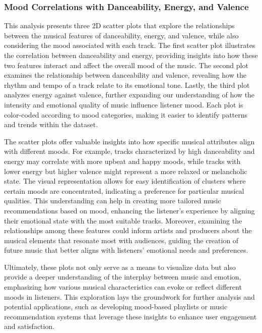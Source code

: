 \documentclass[
]{article}
\begin{document}
\subsubsection{Mood Correlations with Danceability, Energy, and
Valence}\label{mood-correlations-with-danceability-energy-and-valence}

This analysis presents three 2D scatter plots that explore the
relationships between the musical features of danceability, energy, and
valence, while also considering the mood associated with each track. The
first scatter plot illustrates the correlation between danceability and
energy, providing insights into how these two features interact and
affect the overall mood of the music. The second plot examines the
relationship between danceability and valence, revealing how the rhythm
and tempo of a track relate to its emotional tone. Lastly, the third
plot analyzes energy against valence, further expanding our
understanding of how the intensity and emotional quality of music
influence listener mood. Each plot is color-coded according to mood
categories, making it easier to identify patterns and trends within the
dataset.

The scatter plots offer valuable insights into how specific musical
attributes align with different moods. For example, tracks characterized
by high danceability and energy may correlate with more upbeat and happy
moods, while tracks with lower energy but higher valence might represent
a more relaxed or melancholic state. The visual representation allows
for easy identification of clusters where certain moods are
concentrated, indicating a preference for particular musical qualities.
This understanding can help in creating more tailored music
recommendations based on mood, enhancing the listener's experience by
aligning their emotional state with the most suitable tracks. Moreover,
examining the relationships among these features could inform artists
and producers about the musical elements that resonate most with
audiences, guiding the creation of future music that better aligns with
listeners' emotional needs and preferences.

Ultimately, these plots not only serve as a means to visualize data but
also provide a deeper understanding of the interplay between music and
emotion, emphasizing how various musical characteristics can evoke or
reflect different moods in listeners. This exploration lays the
groundwork for further analysis and potential applications, such as
developing mood-based playlists or music recommendation systems that
leverage these insights to enhance user engagement and satisfaction.
\end{document}
